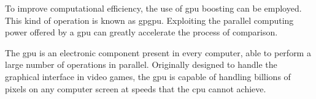\noindent To improve computational efficiency, the use of \gls{gpu} \gls{boost}ing can be employed. This kind of operation is known as \gls{gpgpu}. Exploiting the parallel computing power offered by a \gls{gpu} can greatly accelerate the process of comparison.

\noindent The \gls{gpu} is an electronic component present in every computer, able to perform a large number of operations in parallel. Originally designed to handle the graphical interface in video games, the \gls{gpu} is capable of handling billions of pixels on any computer screen at speeds that the \gls{cpu} cannot achieve.

